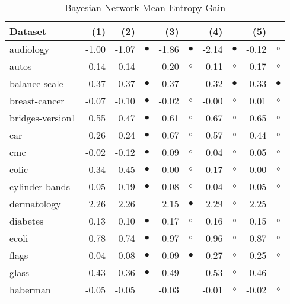 \begin{table}[thb]
\caption{\label{bnmeg}Bayesian Network Mean Entropy Gain}
\footnotesize
{\centering \begin{tabular}{lrr@{\hspace{0.1cm}}cr@{\hspace{0.1cm}}cr@{\hspace{0.1cm}}cr@{\hspace{0.1cm}}c}
\\
\hline
Dataset & (1)& (2) & & (3) & & (4) & & (5) & \\
\hline
audiology & -1.00 & -1.07 & $\bullet$ & -1.86 & $\bullet$ & -2.14 & $\bullet$ & -0.12 &   $\circ$\\
autos & -0.14 & -0.14 &           &  0.20 &   $\circ$ &  0.11 &   $\circ$ &  0.17 &   $\circ$\\
balance-scale &  0.37 &  0.37 & $\bullet$ &  0.37 &           &  0.32 & $\bullet$ &  0.33 & $\bullet$\\
breast-cancer & -0.07 & -0.10 & $\bullet$ & -0.02 &   $\circ$ & -0.00 &   $\circ$ &  0.01 &   $\circ$\\
bridges-version1 &  0.55 &  0.47 & $\bullet$ &  0.61 &   $\circ$ &  0.67 &   $\circ$ &  0.65 &   $\circ$\\
car &  0.26 &  0.24 & $\bullet$ &  0.67 &   $\circ$ &  0.57 &   $\circ$ &  0.44 &   $\circ$\\
cmc & -0.02 & -0.12 & $\bullet$ &  0.09 &   $\circ$ &  0.04 &   $\circ$ &  0.05 &   $\circ$\\
colic & -0.34 & -0.45 & $\bullet$ &  0.00 &   $\circ$ & -0.17 &   $\circ$ &  0.00 &   $\circ$\\
cylinder-bands & -0.05 & -0.19 & $\bullet$ &  0.08 &   $\circ$ &  0.04 &   $\circ$ &  0.05 &   $\circ$\\
dermatology &  2.26 &  2.26 &           &  2.15 & $\bullet$ &  2.29 &   $\circ$ &  2.25 &          \\
diabetes &  0.13 &  0.10 & $\bullet$ &  0.17 &   $\circ$ &  0.16 &   $\circ$ &  0.15 &   $\circ$\\
ecoli &  0.78 &  0.74 & $\bullet$ &  0.97 &   $\circ$ &  0.96 &   $\circ$ &  0.87 &   $\circ$\\
flags &  0.04 & -0.08 & $\bullet$ & -0.09 & $\bullet$ &  0.27 &   $\circ$ &  0.25 &   $\circ$\\
glass &  0.43 &  0.36 & $\bullet$ &  0.49 &           &  0.53 &   $\circ$ &  0.46 &          \\
haberman & -0.05 & -0.05 &           & -0.03 &           & -0.01 &   $\circ$ & -0.02 &   $\circ$\\

\end{tabular}}
\end{table}
